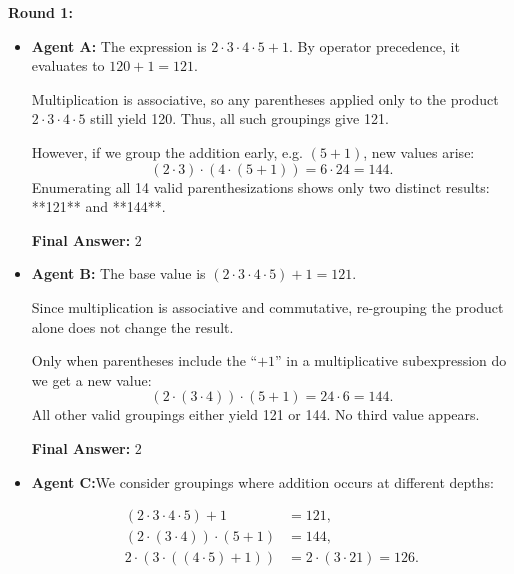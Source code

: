 \begin{tcolorbox}[
    breakable,
    colback=red!5!white,
    colframe=red!60!black,
    title=\textbf{\sffamily Baseline (SoM)},
    fonttitle=\small\bfseries,
    boxrule=0.5pt,
    sharp corners,
    left=2pt, right=2pt, top=2pt, bottom=2pt
]
    \footnotesize
    \textbf{Round 1:}
    \begin{itemize}[leftmargin=1.5em, nosep]
        \item \textbf{Agent A:} The expression is $2 \cdot 3 \cdot 4 \cdot 5 + 1$. By operator precedence, it evaluates to $120 + 1 = 121$.

Multiplication is associative, so any parentheses applied only to the product $2\cdot3\cdot4\cdot5$ still yield 120. Thus, all such groupings give 121.

However, if we group the addition early, e.g. $(5+1)$, new values arise:
\[
(2 \cdot 3) \cdot (4 \cdot (5 + 1)) = 6 \cdot 24 = 144.
\]
Enumerating all 14 valid parenthesizations shows only two distinct results: **121** and **144**.

\medskip
\noindent\textbf{Final Answer:} $\boxed{2}$

        \item \textbf{Agent B:} The base value is $(2 \cdot 3 \cdot 4 \cdot 5) + 1 = 121$.

Since multiplication is associative and commutative, re-grouping the product alone does not change the result.

Only when parentheses include the ``$+1$'' in a multiplicative subexpression do we get a new value:
\[
(2 \cdot (3 \cdot 4)) \cdot (5 + 1) = 24 \cdot 6 = 144.
\]
All other valid groupings either yield 121 or 144. No third value appears.

\medskip
\noindent\textbf{Final Answer:} $\boxed{2}$

        \item \textbf{Agent C:}We consider groupings where addition occurs at different depths:

\begin{align*}
(2 \cdot 3 \cdot 4 \cdot 5) + 1 &= 121, \\
(2 \cdot (3 \cdot 4)) \cdot (5 + 1) &= 144, \\
2 \cdot (3 \cdot ((4 \cdot 5) + 1)) &= 2 \cdot (3 \cdot 21) = 126.
\end{align*}


\end{itemize}
\end{tcolorbox}
